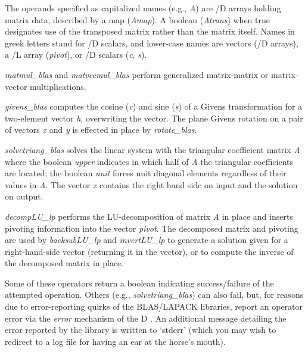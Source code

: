 

The operands specified as capitalized names (e.g., \emph{A}) are /D arrays holding matrix data, described by a map (\emph{Amap}). A boolean (\emph{Atrans}) when true designates use of the transposed matrix rather than the matrix itself. Names in greek letters stand for /D scalars, and lower-case names are vectors (/D arrays), a /L array (\emph{pivot}), or /D scalars (\emph{c}, \emph{s}).

\emph{matmul\_blas} and \emph{matvecmul\_blas} perform generalized matrix-matrix or matrix-vector multiplications.

\emph{givens\_blas} computes the cosine (\emph{c}) and sine (\emph{s}) of a Givens transformation for a two-element vector \emph{h}, overwriting the vector. The plane Givens rotation on a pair of vectors \emph{x} and \emph{y} is effected in place by \emph{rotate\_blas}. 

\emph{solvetriang\_blas} solves the linear system with the triangular coefficient matrix \emph{A} where the boolean \emph{upper} indicates in which half of \emph{A} the triangular coefficients are located; the boolean \emph{unit} forces unit diagonal elements regardless of their values in \emph{A}. The vector \emph{x} contains the right hand side on input and the solution on output.

\emph{decompLU\_lp}  performs the LU-decomposition of matrix \emph{A} in place and inserts pivoting information into the vector \emph{pivot}. The decomposed matrix and pivoting are used by \emph{backsubLU\_lp} and \emph{invertLU\_lp} to generate a solution given for a right-hand-side vector (returning it in the vector), or to compute the inverse of the decomposed matrix in place.
 
 
Some of these operators return a boolean indicating success/failure of the attempted operation. Others (e.g., \emph{solvetriang\_blas}) can also fail, but, for reasons due to error-reporting quirks of the BLAS/LAPACK libraries, report an operator error via the \emph{error} mechanism of the D . An additional message detailing the error reported by the library is written to `stderr' (which you may wish to redirect to a log file for having an ear at the horse's mouth).

